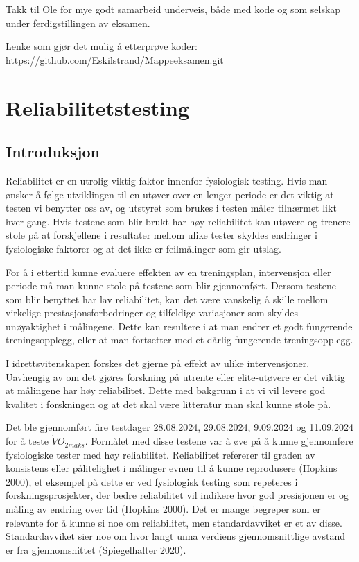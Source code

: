 \documentclass[
  letterpaper,
  DIV=11,
  numbers=noendperiod]{scrreprt}
\begin{document}
Takk til Ole for mye godt samarbeid underveis, både med kode og som
selskap under ferdigstillingen av eksamen.

Lenke som gjør det mulig å etterprøve koder:
https://github.com/Eskilstrand/Mappeeksamen.git


\chapter{Reliabilitetstesting}\label{reliabilitetstesting}

\section{Introduksjon}\label{introduksjon}

Reliabilitet er en utrolig viktig faktor innenfor fysiologisk testing.
Hvis man ønsker å følge utviklingen til en utøver over en lenger periode
er det viktig at testen vi benytter oss av, og utstyret som brukes i
testen måler tilnærmet likt hver gang. Hvis testene som blir brukt har
høy reliabilitet kan utøvere og trenere stole på at forskjellene i
resultater mellom ulike tester skyldes endringer i fysiologiske faktorer
og at det ikke er feilmålinger som gir utslag.

For å i ettertid kunne evaluere effekten av en treningsplan,
intervensjon eller periode må man kunne stole på testene som blir
gjennomført. Dersom testene som blir benyttet har lav reliabilitet, kan
det være vanskelig å skille mellom virkelige prestasjonsforbedringer og
tilfeldige variasjoner som skyldes unøyaktighet i målingene. Dette kan
resultere i at man endrer et godt fungerende treningsopplegg, eller at
man fortsetter med et dårlig fungerende treningsopplegg.

I idrettsvitenskapen forskes det gjerne på effekt av ulike
intervensjoner. Uavhengig av om det gjøres forskning på utrente eller
elite-utøvere er det viktig at målingene har høy reliabilitet. Dette med
bakgrunn i at vi vil levere god kvalitet i forskningen og at det skal
være litteratur man skal kunne stole på.

Det ble gjennomført fire testdager 28.08.2024, 29.08.2024, 9.09.2024 og
11.09.2024 for å teste \(\dot{V}O_{2maks}\). Formålet med disse testene
var å øve på å kunne gjennomføre fysiologiske tester med høy
reliabilitet. Reliabilitet refererer til graden av konsistens eller
pålitelighet i målinger evnen til å kunne reprodusere (Hopkins 2000), et
eksempel på dette er ved fysiologisk testing som repeteres i
forskningsprosjekter, der bedre reliabilitet vil indikere hvor god
presisjonen er og måling av endring over tid (Hopkins 2000). Det er
mange begreper som er relevante for å kunne si noe om reliabilitet, men
standardavviket er et av disse. Standardavviket sier noe om hvor langt
unna verdiens gjennomsnittlige avstand er fra gjennomsnittet
(Spiegelhalter 2020).
\end{document}
